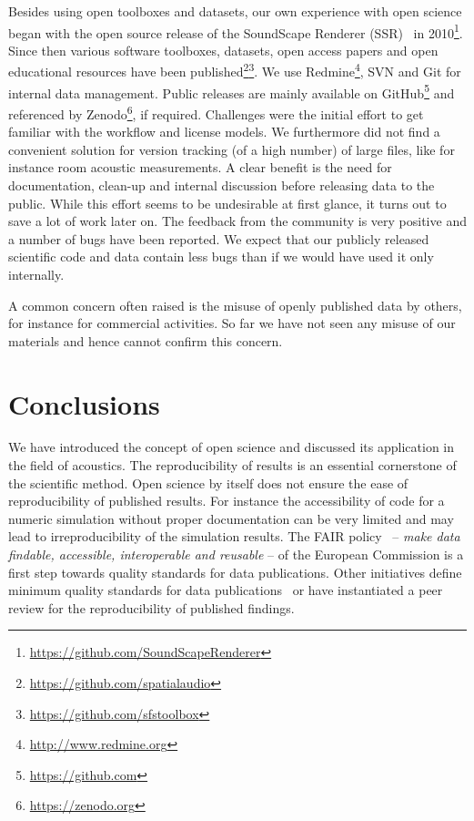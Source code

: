 \documentclass[a4paper, 10pt, twocolumn]{article}
\begin{document}
Besides using open toolboxes and datasets, our own experience with open science began 
with the open source release of the SoundScape Renderer (SSR)~\cite{Geier07:DEGA} in 
2010\footnote{\url{https://github.com/SoundScapeRenderer}}. Since then various software toolboxes, 
datasets, open access papers and open educational resources have been 
published\footnote{\url{https://github.com/spatialaudio}}\footnote{\url{https://github.com/sfstoolbox}}. 
We use Redmine\footnote{\url{http://www.redmine.org}}, SVN and Git for internal data management. Public releases are mainly
available on GitHub\footnote{\url{https://github.com}} and referenced by Zenodo\footnote{\url{https://zenodo.org}}, if required. 
Challenges were the initial effort to get familiar with the workflow and license models. We furthermore did not find
a convenient solution for version tracking (of a high number) of large files, like for instance room 
acoustic measurements. A clear benefit is the need for documentation, clean-up and internal
discussion before releasing data to the public. While this effort seems to be undesirable at
first glance, it turns out to save a lot of work later on. The feedback from the community
is very positive and a number of bugs have been reported. We expect that our publicly 
released scientific code and data contain less bugs than if we would have used it 
only internally.

A common concern often raised is the misuse of openly published data by others, 
for instance for commercial activities. So far we have not seen any misuse of our
materials and hence cannot confirm this concern.


\section*{Conclusions} \label{sec:conclusions}

We have introduced the concept of open science and discussed its application in the
field of acoustics. The reproducibility of results is an essential cornerstone of
the scientific method. Open science by itself does not ensure the ease of reproducibility of
published results. For instance the accessibility of code for a numeric simulation without
proper documentation can be very limited and may lead to irreproducibility of the simulation results. 
The FAIR policy~\cite{H2020_FAIR:ERC} -- \emph{make data findable, accessible, interoperable and reusable} -- 
of the European Commission is a first step towards quality standards for data publications. 
Other initiatives define minimum quality standards for data publications~\cite{TOPGuidelines} 
or have instantiated a peer review for the reproducibility of published findings.
\end{document}
